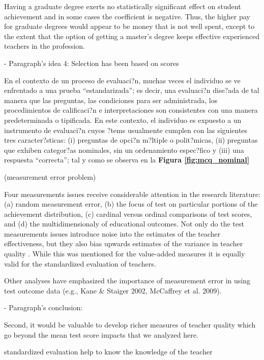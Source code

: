 Having a graduate degree exerts no statistically significant effect on student achievement and in some cases the coefficient is negative. Thus, the higher pay for graduate degrees would appear to be money that is not well spent, except to the extent that the option of getting a master’s degree keeps effective experienced teachers in the profession. \citep{Clotfelter_et_al_2007}



- Paragraph's idea 4: Selection has been based on scores

En el contexto de un proceso de evaluaci?n, muchas veces el individuo se ve enfrentado a una prueba ``estandarizada''; es decir, una evaluaci?n dise?ada de tal manera que las preguntas, las condiciones para ser administrada, los procedimientos de calificaci?n e interpretaciones son consistentes con una manera predeterminada o tipificada. En este contexto, el individuo es expuesto a un instrumento de evaluaci?n cuyos ?tems usualmente cumplen con las siguientes tres caracter?sticas: (i) preguntas de opci?n m?ltiple o polit?micas, (ii) preguntas que exhiben categor?as nominales, sin un ordenamiento espec?fico y (iii) una respuesta ``correcta''; tal y como se observa en la \textbf{Figura \ref{fig:mcq_nominal}}

 (measurement error problem)


Four measurements issues receive considerable attention in the research literature: (a) random measurement error, (b) the focus of test on particular portions of the achievement distribution, (c) cardinal versus ordinal comparisons of test scores, and (d) the multidimensionaly of educational outcomes. Not only do the test measurements issues introduce noise into the estimates of the teacher effectiveness, but they also bias upwards estimates of the variance in teacher quality \citep{Hanushek_et_al_2012}. While this was mentioned for the value-added measures it is equally valid for the standardized evaluation of teachers.


Other analyses have emphasized the importance of measurement error in using test outcome data (e.g., Kane & Staiger 2002, McCaffrey et al. 2009).


- Paragraph's conclusion: 

Second, it would be valuable to develop richer measures of teacher quality which go beyond the mean test score impacts that we analyzed here. \citep{Chetty_et_al_2014a}

standardized evaluation help to know the knowledge of the teacher

